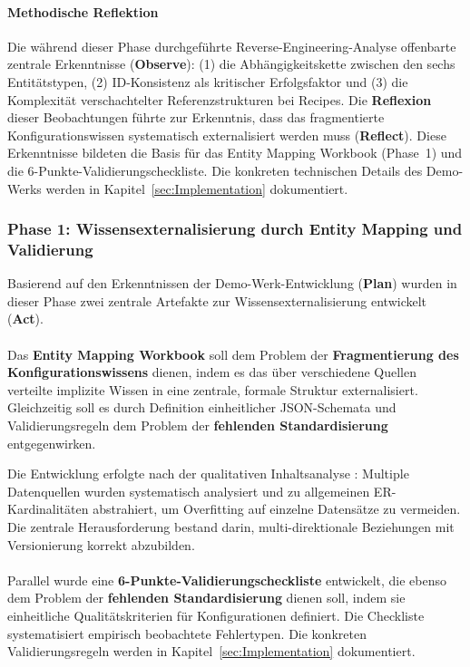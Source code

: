 \paragraph{Methodische Reflektion}

Die während dieser Phase durchgeführte Reverse-Engineering-Analyse offenbarte zentrale Erkenntnisse (\textbf{Observe}): (1) die Abhängigkeitskette zwischen den sechs Entitätstypen, (2) ID-Konsistenz als kritischer Erfolgsfaktor und (3) die Komplexität verschachtelter Referenzstrukturen bei Recipes. Die \textbf{Reflexion} dieser Beobachtungen führte zur Erkenntnis, dass das fragmentierte Konfigurationswissen systematisch externalisiert werden muss (\textbf{Reflect}). Diese Erkenntnisse bildeten die Basis für das Entity Mapping Workbook (Phase~1) und die 6-Punkte-Validierungscheckliste. Die konkreten technischen Details des Demo-Werks werden in Kapitel~\ref{sec:Implementation} dokumentiert.


\subsubsection{Phase 1: Wissensexternalisierung durch Entity Mapping und Validierung}
\label{subsubsec:Phase1}

Basierend auf den Erkenntnissen der Demo-Werk-Entwicklung (\textbf{Plan}) wurden in dieser Phase zwei zentrale Artefakte zur Wissensexternalisierung entwickelt (\textbf{Act}).
\\\\
Das \textbf{Entity Mapping Workbook} soll dem Problem der \textbf{Fragmentierung des Konfigurationswissens} dienen, indem es das über verschiedene Quellen verteilte implizite Wissen in eine zentrale, formale Struktur externalisiert. Gleichzeitig soll es durch Definition einheitlicher JSON-Schemata und Validierungsregeln dem Problem der \textbf{fehlenden Standardisierung} entgegenwirken.

\noindent Die Entwicklung erfolgte nach der qualitativen Inhaltsanalyse \citep{mayring:qualitative2015}: Multiple Datenquellen wurden systematisch analysiert und zu allgemeinen ER-Kardinalitäten abstrahiert, um Overfitting auf einzelne Datensätze zu vermeiden. Die zentrale Herausforderung bestand darin, multi-direktionale Beziehungen mit Versionierung korrekt abzubilden.
\\\\
Parallel wurde eine \textbf{6-Punkte-Validierungscheckliste} entwickelt, die ebenso dem Problem der \textbf{fehlenden Standardisierung} dienen soll, indem sie einheitliche Qualitätskriterien für Konfigurationen definiert. Die Checkliste systematisiert empirisch beobachtete Fehlertypen. Die konkreten Validierungsregeln werden in Kapitel~\ref{sec:Implementation} dokumentiert.

